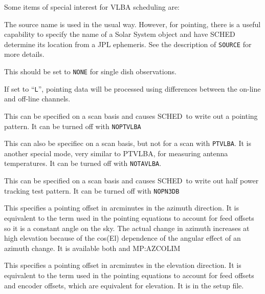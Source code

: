 \documentclass{report}
\newcommand{\schedb}{{\sc SCHED~}}
\begin{document}
Some items of special interest for VLBA scheduling are:
\begin{list}{}{\parsep 0em  \itemsep 0em }

\item {} The source name is used in
the usual way.  However, for pointing, there is a useful capability
to specify the name of a Solar System object and have \schedb
determine its location from a JPL ephemeris.  See the description
of {\tt SOURCE} for more details.

\item {} This should be set to
{\tt NONE} for single dish observations.

\item {} If set to ``{\tt L}'',
pointing data will be processed using differences between the
on-line and off-line channels.

\item {} This can be specified on a
scan basis and causes \schedb to write out a pointing pattern.  It can
be turned off with {\tt NOPTVLBA}

\item {} This can also be specifiec
on a scan basis, but not for a scan with {\tt PTVLBA}.  It is another
special mode, very similar to PTVLBA, for measuring antenna
temperatures.  It can be turned off with {\tt NOTAVLBA}.

\item {} This can be specified on a
scan basis and causes \schedb to write out half power tracking test
pattern.  It can be turned off with {\tt NOPN3DB}

\item {} This specifies a pointing
offset in arcminutes in the azimuth direction.  It is equivalent to
the term used in the pointing equations to account for feed offsets
so it is a constant angle on the sky.  The actual change in azimuth
increases at high elevation because of the cos(El) dependence of
the angular effect of an azimuth change.  It is available both
 and 
{MP:AZCOLIM}

\item {} This specifies a pointing
offset in arcminutes in the elevation direction.  It is equivalent to
the term used in the pointing equations to account for feed offsets
and encoder offsets, which are equivalent for elevation.  It is in
the setup file.


\end{list}
\end{document}
